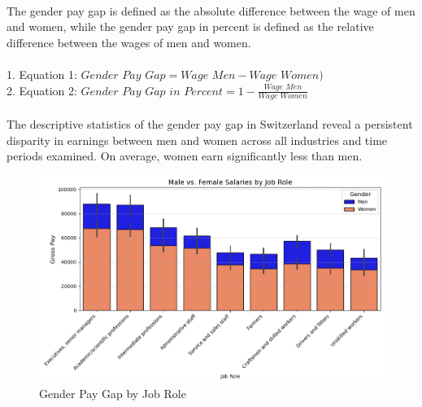 \documentclass{article}
\begin{document}
\begin{table}[H]
\centering
{}\
\caption{Descriptive Statistics on Gender Pay Gap Across Switzerland and Years}
\end{table}

The gender pay gap is defined as the absolute difference between the wage of men and women, while the gender pay gap in percent is defined as the relative difference between the wages of men and women.\\
\\
  1. Equation 1: \(\textit{Gender Pay Gap} = \textit{Wage Men} - \textit{Wage Women)}\)\\
  2. Equation 2: \(\textit{Gender Pay Gap in Percent} = 1 - \frac{\textit{Wage Men}} 
 {\textit{Wage Women}}\)\\
\\
The descriptive statistics of the gender pay gap in Switzerland reveal a persistent disparity in earnings between men and women across all industries and time periods examined. On average, women earn significantly less than men. \\

\begin{figure}[h]
    \centering
    \includegraphics[width=1\textwidth]{Figures/Salaries_by_Job_Role.png}
    \caption{Gender Pay Gap by Job Role}
    \label{fig:pay_gap_roles}
\end{figure}
\end{document}
